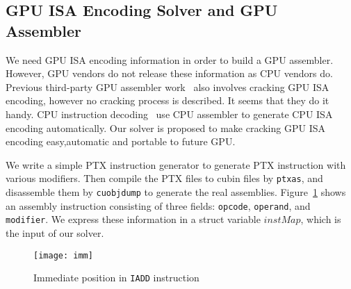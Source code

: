 \subsection{GPU ISA Encoding Solver and GPU Assembler}
We need GPU ISA encoding information in order to build a GPU assembler.
However, GPU vendors do not release these information as CPU vendors do.
Previous third-party GPU assembler work~\cite{decuda,asfermi,maxas} also
involves cracking GPU ISA encoding, however no cracking process is described.
It seems that they do it handy. CPU instruction decoding~\cite{collberg1997reverse,engler2000derive} use CPU assembler to generate CPU ISA encoding automatically. Our solver is proposed to make cracking GPU ISA
encoding easy,automatic and portable to future GPU.

We write a simple PTX instruction generator to generate PTX instruction with various modifiers.
Then compile the PTX files to cubin files by {\tt ptxas}, and disassemble them by {\tt cuobjdump} to generate the real assemblies. 
Figure~\ref{fig:imm} shows an assembly instruction consisting of three fields: {\tt opcode}, {\tt operand}, and {\tt modifier}. We express these information in a struct
variable $instMap$, which is the input of our solver.
\begin{figure}[htbp]
\begin{center}
\texttt{[image: imm]}
    \caption{Immediate position in {\tt IADD} instruction}
\label{fig:imm}
\end{center}
\end{figure}

